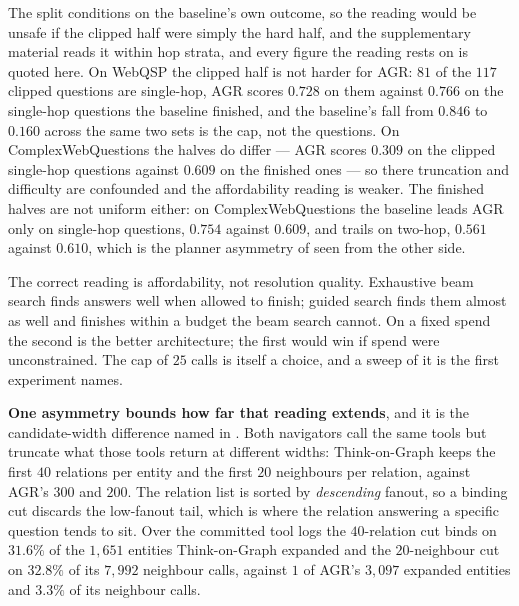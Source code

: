 The split conditions on the baseline's own outcome, so the reading would
be unsafe if the clipped half were simply the hard half, and the
supplementary material reads it within hop strata, and every figure the
reading rests on is quoted here. On WebQSP the clipped half is not
harder for AGR: $81$ of the $117$ clipped questions are single-hop, AGR
scores $0.728$ on them against $0.766$ on the single-hop questions the
baseline finished, and the baseline's fall from $0.846$ to $0.160$
across the same two sets is the cap, not the questions. On
ComplexWebQuestions the halves do differ --- AGR scores $0.309$ on the
clipped single-hop questions against $0.609$ on the finished ones --- so
there truncation and difficulty are confounded and the affordability
reading is weaker. The finished halves are not uniform either: on
ComplexWebQuestions the baseline leads AGR only on single-hop questions,
$0.754$ against $0.609$, and trails on two-hop, $0.561$ against $0.610$,
which is the planner asymmetry of  seen from the other
side.

The correct reading is affordability, not resolution quality. Exhaustive
beam search finds answers well when allowed to finish; guided search
finds them almost as well and finishes within a budget the beam search
cannot. On a fixed spend the second is the better architecture; the
first would win if spend were unconstrained. The cap of $25$ calls is
itself a choice, and a sweep of it is the first experiment
 names.

\textbf{One asymmetry bounds how far that reading extends}, and it is
the candidate-width difference named in . Both
navigators call the same tools but truncate what those tools return at
different widths: Think-on-Graph keeps the first $40$ relations per
entity and the first $20$ neighbours per relation, against AGR's $300$
and $200$. The relation list is sorted by \emph{descending} fanout, so a
binding cut discards the low-fanout tail, which is where the relation
answering a specific question tends to sit. Over the committed tool logs
the $40$-relation cut binds on $31.6\%$ of the $1{,}651$ entities
Think-on-Graph expanded and the $20$-neighbour cut on $32.8\%$ of its
$7{,}992$ neighbour calls, against $1$ of AGR's $3{,}097$ expanded
entities and $3.3\%$ of its neighbour calls.


